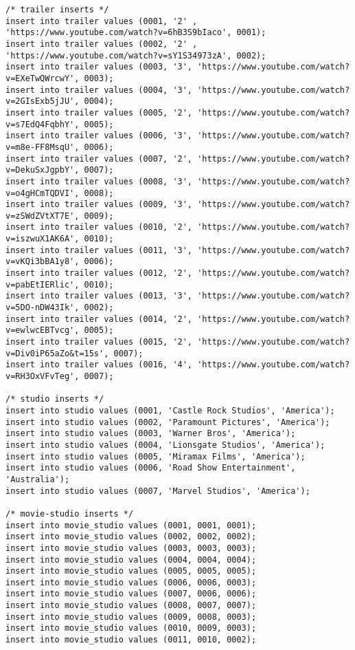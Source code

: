 \documentclass[12pt]{article}
\begin{document}
\begin{lstlisting}
/* trailer inserts */
insert into trailer values (0001, '2' , 'https://www.youtube.com/watch?v=6hB3S9bIaco', 0001);
insert into trailer values (0002, '2' , 'https://www.youtube.com/watch?v=sY1S34973zA', 0002);
insert into trailer values (0003, '3', 'https://www.youtube.com/watch?v=EXeTwQWrcwY', 0003);
insert into trailer values (0004, '3', 'https://www.youtube.com/watch?v=2GIsExb5jJU', 0004);
insert into trailer values (0005, '2', 'https://www.youtube.com/watch?v=s7EdQ4FqbhY', 0005);
insert into trailer values (0006, '3', 'https://www.youtube.com/watch?v=m8e-FF8MsqU', 0006);
insert into trailer values (0007, '2', 'https://www.youtube.com/watch?v=DekuSxJgpbY', 0007);
insert into trailer values (0008, '3', 'https://www.youtube.com/watch?v=o4gHCmTQDVI', 0008);
insert into trailer values (0009, '3', 'https://www.youtube.com/watch?v=zSWdZVtXT7E', 0009);
insert into trailer values (0010, '2', 'https://www.youtube.com/watch?v=iszwuX1AK6A', 0010);
insert into trailer values (0011, '3', 'https://www.youtube.com/watch?v=vKQi3bBA1y8', 0006);
insert into trailer values (0012, '2', 'https://www.youtube.com/watch?v=pabEtIERlic', 0010);
insert into trailer values (0013, '3', 'https://www.youtube.com/watch?v=5DO-nDW43Ik', 0002);
insert into trailer values (0014, '2', 'https://www.youtube.com/watch?v=ewlwcEBTvcg', 0005);
insert into trailer values (0015, '2', 'https://www.youtube.com/watch?v=Div0iP65aZo&t=15s', 0007);
insert into trailer values (0016, '4', 'https://www.youtube.com/watch?v=RH3OxVFvTeg', 0007);

/* studio inserts */
insert into studio values (0001, 'Castle Rock Studios', 'America');
insert into studio values (0002, 'Paramount Pictures', 'America');
insert into studio values (0003, 'Warner Bros', 'America');
insert into studio values (0004, 'Lionsgate Studios', 'America');
insert into studio values (0005, 'Miramax Films', 'America');
insert into studio values (0006, 'Road Show Entertainment', 'Australia');
insert into studio values (0007, 'Marvel Studios', 'America');

/* movie-studio inserts */
insert into movie_studio values (0001, 0001, 0001);
insert into movie_studio values (0002, 0002, 0002);
insert into movie_studio values (0003, 0003, 0003);
insert into movie_studio values (0004, 0004, 0004);
insert into movie_studio values (0005, 0005, 0005);
insert into movie_studio values (0006, 0006, 0003);
insert into movie_studio values (0007, 0006, 0006);
insert into movie_studio values (0008, 0007, 0007);
insert into movie_studio values (0009, 0008, 0003);
insert into movie_studio values (0010, 0009, 0003);
insert into movie_studio values (0011, 0010, 0002);


\end{lstlisting}
\end{document}
